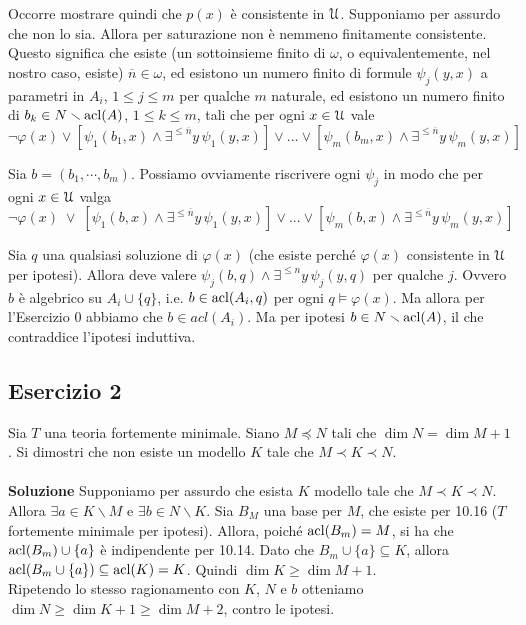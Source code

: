 \documentclass[10pt,a4paper]{article}
\def\phi{\varphi}
\def\U{\EuScript U}
\def\E{\exists}
\def\acl{{\rm acl}}
\def\models{\vDash}
\def\sm{\smallsetminus}
\begin{document}
Occorre mostrare quindi che $p(x)$ è consistente in $\U$. Supponiamo per assurdo che non lo sia. Allora per saturazione non è nemmeno finitamente consistente. Questo significa che esiste (un sottoinsieme finito di $\omega$, o equivalentemente, nel nostro caso, esiste) $\overline{n} \in \omega$, ed esistono un numero finito di formule $\psi_j(y,x)$ a parametri in $A_i$, $1 \leq j \leq m$ per qualche $m$ naturale, ed esistono un numero finito di $b_{k} \in N \sm \acl(A)$, $1 \leq k \leq m$, tali che per ogni $x \in \U$ vale 
$$\neg \phi(x) \vee [\psi_1(b_1,x) \wedge \E^{\le \overline{n}}y\,\psi_1(y,x)] \vee ... \vee [\psi_m(b_m,x) \wedge \E^{\le \overline{n}}y\,\psi_m(y,x)]$$

Sia $b=(b_1, \cdots, b_m)$. Possiamo ovviamente riscrivere ogni $\psi_j$ in modo che per ogni $x \in \U$ valga
$$\neg \phi(x) \; \vee \; [\psi_1(b,x) \wedge \E^{\le \overline{n}}y\,\psi_1(y,x)] \vee ... \vee [\psi_m(b,x) \wedge \E^{\le \overline{n}}y\,\psi_m(y,x)]$$

Sia $q$ una qualsiasi soluzione di $\phi(x)$ (che esiste perché $\phi(x)$ consistente in $\U$ per ipotesi). Allora deve valere $\psi_j(b,q) \wedge \E^{\le n}y\,\psi_j(y,q)$ per qualche $j$. Ovvero $b$ è algebrico su $A_i \cup \{q\}$, i.e. $b \in \acl(A_i,q)$ per ogni $q \models \phi(x)$. Ma allora per l'Esercizio 0 abbiamo che $b \in acl(A_i)$. Ma per ipotesi $b \in N \sm \acl(A)$, il che contraddice l'ipotesi induttiva.

\subsection*{Esercizio 2}

Sia $T$ una teoria fortemente minimale. Siano $M\preceq N$ tali che $\dim N=\dim M+1$. Si dimostri che non esiste un modello $K$ tale che $M\prec K\prec N$.\\
\\
\noindent\textbf{Soluzione} Supponiamo per assurdo che esista $K$ modello tale che $M\prec K\prec N$. Allora $\exists a \in K \sm M$ e $\exists b \in N \sm K$. Sia $B_M$ una base per $M$, che esiste per 10.16 ($T$ fortemente minimale per ipotesi). Allora, poiché $\acl(B_m) = M$, si ha che $\acl(B_m) \cup \{a\}$ è indipendente per 10.14. Dato che $B_m \cup \{a\} \subseteq K$, allora $\acl(B_m \cup \{a\}) \subseteq \acl(K)=K$. Quindi $\dim K \geq \dim M +1$.\\
Ripetendo lo stesso ragionamento con $K$, $N$ e $b$ otteniamo $\dim N \geq \dim K +1 \geq \dim M +2$, contro le ipotesi.
\end{document}

